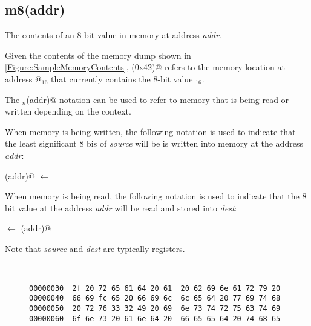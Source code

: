 \begin{figure}[ht]
\centering
{}
\label{Figure:slzrNegative}
\end{figure}


\subsection{m8(addr)}
\label{memory:m8}

The contents of an 8-bit value in memory at address {\em addr}.

Given the contents of the memory dump shown in 
\autoref{Figure:SampleMemoryContents}, 
(0x42)@ refers to the memory location at address @$_{16}$ 
that currently contains the 8-bit value \verb@fc@$_{16}$.

The \verb@m@$_n$\verb@(addr)@ notation can be used to refer to memory that is being 
read or written depending on the context.  

When memory is being written, the following notation is used to indicate that 
the least significant 8 bis of {\em source} will be is written into memory at 
the address {\em addr}:

(addr)@ $\leftarrow$ \verb@source@

When memory is being read, the following notation is used to indicate that the 
8 bit value at the address {\em addr} will be read and stored into {\em dest}:

\verb@dest@ $\leftarrow$ (addr)@ 

Note that {\em source} and {\em dest} are typically registers.
 

\begin{figure}[ht]
\centering
\begin{BVerbatim}


00000030  2f 20 72 65 61 64 20 61  20 62 69 6e 61 72 79 20
00000040  66 69 fc 65 20 66 69 6c  6c 65 64 20 77 69 74 68
00000050  20 72 76 33 32 49 20 69  6e 73 74 72 75 63 74 69
00000060  6f 6e 73 20 61 6e 64 20  66 65 65 64 20 74 68 65
\end{BVerbatim}
\label{Figure:SampleMemoryContents}
\end{figure}

